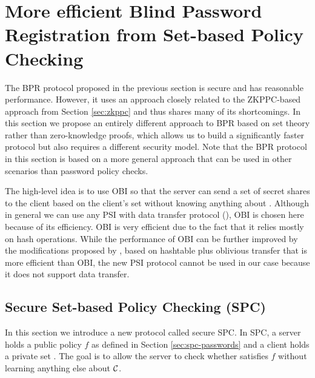 \section[SPC-based Password Registration]{More efficient Blind Password Registration from Set-based Policy Checking}\label{sec:spc-bpr}

The \ac{BPR} protocol proposed in the previous section is secure and has reasonable performance.
However, it uses an approach closely related to the \ac{ZKPPC}-based approach from Section \ref{sec:zkppc} and thus shares many of its shortcomings.
In this section we propose an entirely different approach to \acl{BPR} based on set theory rather than zero-knowledge proofs, which allows us to build a significantly faster protocol but also requires a different security model.
Note that the \ac{BPR} protocol in this section is based on a more general approach that can be used in other scenarios than password policy checks.

The high-level idea is to use \ac{OBI} so that the server can send a set of secret shares to the client based on the client's set \cC without knowing anything about \cC. 
Although in general we can use any \ac{PSI} with data transfer protocol (\eg \citet{fre04}), \ac{OBI} is chosen here because of its efficiency. 
\ac{OBI} is very efficient due to the fact that it relies mostly on hash operations. 
While the performance of \ac{OBI} can be further improved by the modifications proposed by \citet{Pinkas0Z14}, based on hashtable plus oblivious transfer that is more efficient than \ac{OBI}, the new \ac{PSI} protocol cannot be used in our case because it does not support data transfer.

\subsection{Secure Set-based Policy Checking (SPC)} \label{sec:spc}
In this section we introduce a new protocol called secure \ac{SPC}. 
In \ac{SPC}, a server holds a public policy $f$ as defined in Section \ref{sec:spc-passwords} and a client holds a private set \cC. 
The goal is to allow the server to check whether \cC satisfies $f$ without learning anything else about $\mathcal{C}$. 

